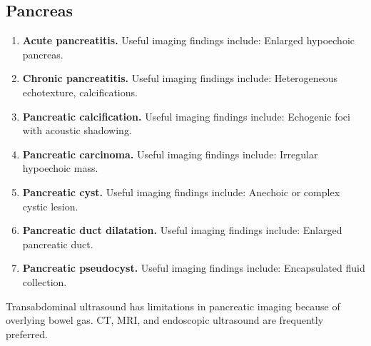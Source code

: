 \subsection{Pancreas}
\begin{enumerate}[leftmargin=*,itemsep=0.45em,topsep=0.4em]
\item \textbf{Acute pancreatitis.} Useful imaging findings include: Enlarged hypoechoic pancreas.
\item \textbf{Chronic pancreatitis.} Useful imaging findings include: Heterogeneous echotexture, calcifications.
\item \textbf{Pancreatic calcification.} Useful imaging findings include: Echogenic foci with acoustic shadowing.
\item \textbf{Pancreatic carcinoma.} Useful imaging findings include: Irregular hypoechoic mass.
\item \textbf{Pancreatic cyst.} Useful imaging findings include: Anechoic or complex cystic lesion.
\item \textbf{Pancreatic duct dilatation.} Useful imaging findings include: Enlarged pancreatic duct.
\item \textbf{Pancreatic pseudocyst.} Useful imaging findings include: Encapsulated fluid collection.
\end{enumerate}

Transabdominal ultrasound has limitations in pancreatic imaging because of overlying bowel gas. CT, MRI, and endoscopic ultrasound are frequently preferred.


